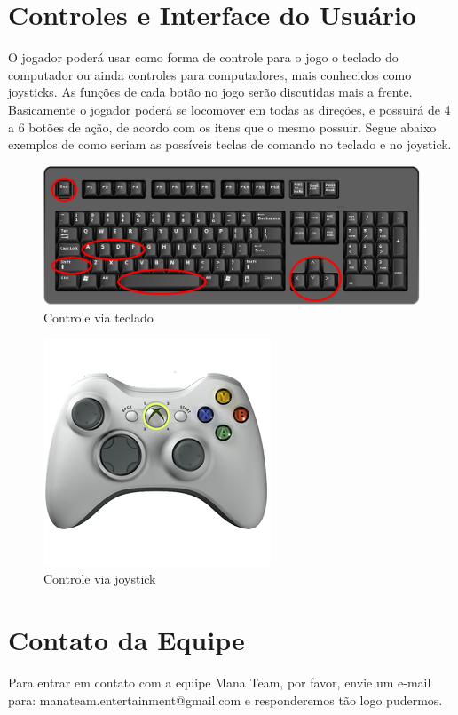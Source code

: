 \documentclass[12pt]{article}
\begin{document}
\section{Controles e Interface do Usuário}
O jogador poderá usar como forma de controle para o jogo o teclado do computador ou ainda controles para computadores, mais conhecidos como joysticks. As funções de cada botão no jogo serão discutidas mais a frente. Basicamente o jogador poderá se locomover em todas as direções, e possuirá de 4 a 6 botões de ação, de acordo com os itens que o mesmo possuir. Segue abaixo exemplos de como seriam as possíveis teclas de comando no teclado e no joystick.

\begin{figure}[ht]
    \centering
    \caption{Controle via teclado}
    \includegraphics[keepaspectratio=true,scale=0.4]{controles.png}
\end{figure}

\begin{figure}[ht]
    \centering
    \caption{Controle via joystick}
    \includegraphics[keepaspectratio=true,scale=0.7]{joy360.png}
\end{figure}

\section{Contato da Equipe}
Para entrar em contato com a equipe Mana Team, por favor, envie um e-mail para: manateam.entertainment@gmail.com e responderemos tão logo pudermos.
\end{document}
